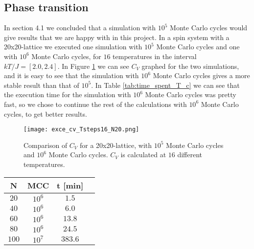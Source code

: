\documentclass[12pt]{article}
\begin{document}
\begin{flushleft}
\subsection{Phase transition}
In section 4.1 we concluded that a simulation with $10^5$ Monte Carlo cycles would give results that we are happy with in this project. In a spin system with a 20x20-lattice we executed one simulation with $10^5$ Monte Carlo cycles and one with $10^6$ Monte Carlo cycles, for $16$ temperatures in the interval $kT/J = [2.0,2.4]$. In Figure \ref{fig:CV_1e5_and_1e6} we can see $C_V$ graphed for the two simulations, and it is easy to see that the simulation with $10^6$ Monte Carlo cycles gives a more stable result than that of $10^5$. In Table \ref{tab:time_spent_T_c} we can see that the execution time for the simulation with $10^6$ Monte Carlo cycles was pretty fast, so we chose to continue the rest of the calculations with $10^6$ Monte Carlo cycles, to get better results.
\begin{figure}[!h]
\begin{center}
\texttt{[image: exce\_cv\_Tsteps16\_N20.png]}
\caption{\label{fig:CV_1e5_and_1e6}Comparison of $C_V$ for a 20x20-lattice, with $10^5$ Monte Carlo cycles and $10^6$ Monte Carlo cycles. $C_V$ is calculated at $16$ different temperatures.}
\end{center}
\end{figure}

\begin{table}[!h]
\begin{center}
\begin{tabular}{| c | c | c | c |}
	\hline
	 \textbf{N} & \textbf{MCC} & \textbf{t [min]}\\
	\hline	
	 $20$ & $10^6$ & $1.5$\\
	 $40$ & $10^6$ & $6.0$\\
	 $60$ & $10^6$ & $13.8$\\
	 $80$ & $10^6$ & $24.5$\\
	 $100$ & $10^7$ & $383.6$\\


\end{tabular}
\end{center}
\end{table}
\end{flushleft}
\end{document}
